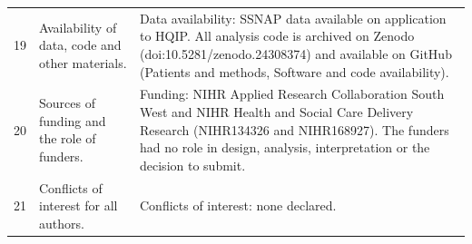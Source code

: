 {\begin{longtable}{p{1.0cm} p{4.6cm} p{10.4cm}}
19 & Availability of data, code and other materials. & Data availability: SSNAP data available on application to HQIP. All analysis code is archived on Zenodo (doi:10.5281/zenodo.24308374) and available on GitHub (Patients and methods, Software and code availability). \\
20 & Sources of funding and the role of funders. & Funding: NIHR Applied Research Collaboration South West and NIHR Health and Social Care Delivery Research (NIHR134326 and NIHR168927). The funders had no role in design, analysis, interpretation or the decision to submit. \\
21 & Conflicts of interest for all authors. & Conflicts of interest: none declared. \\
\end{longtable}
}


\clearpage

